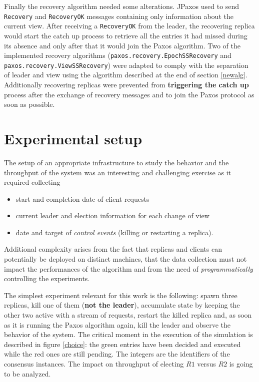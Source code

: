 \documentclass[a4paper, 10pt]{article}
\begin{document}
Finally the recovery algorithm needed some alterations. JPaxos used to send \texttt{Recovery} and \texttt{RecoveryOK} messages containing only information about the current view. After receiving a \texttt{RecoveryOK} from the leader, the recovering replica would start the catch up process to retrieve all the entries it had missed during its absence and only after that it would join the Paxos algorithm. Two of the implemented recovery algorithms (\texttt{paxos.recovery.EpochSSRecovery} and \texttt{paxos.recovery.ViewSSRecovery}) were adapted to comply with the separation of leader and view using the algorithm described at the end of section \ref{newalg}. Additionally recovering replicas were prevented from \textbf{triggering the catch up} process after the exchange of recovery messages and to join the Paxos protocol as soon as possible.

\section{Experimental setup}\label{exp}
The setup of an appropriate infrastructure to study the behavior and the throughput of the system was an interesting and challenging exercise as it required collecting
\begin{itemize}
    \item start and completion date of client requests
    \item current leader and election information for each change of view
    \item date and target of \textit{control events} (killing or restarting a replica).
\end{itemize}
Additional complexity arises from the fact that replicas and clients can potentially be deployed on distinct machines, that the data collection must not impact the performances of the algorithm and from the need of \textit{programmatically} controlling the experiments.

The simplest experiment relevant for this work is the following: spawn three replicas, kill one of them (\textbf{not the leader}), accumulate state by keeping the other two active with a stream of requests, restart the killed replica and, as soon as it is running the Paxos algorithm again, kill the leader and observe the behavior of the system. The critical moment in the execution of the simulation is described in figure \ref{choice}: the green entries have been decided and executed while the red ones are still pending. The integers are the identifiers of the consensus instances. The impact on throughput of electing $R1$ versus $R2$ is going to be analyzed.
\end{document}
